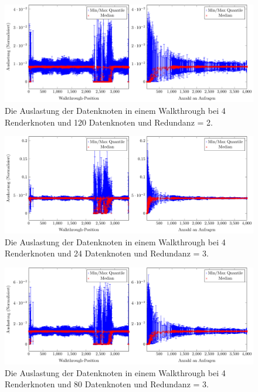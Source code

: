 \begin{figure}
\centering
\includegraphics[scale=0.75]{images/diag_cCol_red2_render4_data120_2x.pdf}
\caption{\label{fig:eval:cCol3}Die Auslastung der Datenknoten in einem Walkthrough bei 4 Renderknoten und 120 Datenknoten und Redundanz = 2.}
\end{figure}

\begin{figure}
\centering
\includegraphics[scale=0.75]{images/diag_cCol_red3_render4_data24_2x.pdf}
\caption{\label{fig:eval:cCol1}Die Auslastung der Datenknoten in einem Walkthrough bei 4 Renderknoten und 24 Datenknoten und Redundanz = 3.}
\end{figure}

\begin{figure}
\centering
\includegraphics[scale=0.75]{images/diag_cCol_red3_render4_data80_2x.pdf}
\caption{\label{fig:eval:cCol1}Die Auslastung der Datenknoten in einem Walkthrough bei 4 Renderknoten und 80 Datenknoten und Redundanz = 3.}
\end{figure}

